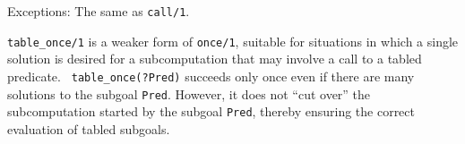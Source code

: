 \begin{description}
    Exceptions: The same as {\tt call/1}.

    {\tt table\_once/1} is a weaker form of {\tt once/1}, suitable for
    situations in which a single solution is desired for a
    subcomputation that may involve a call to a tabled predicate.  {\tt
    table\_once(?Pred)} succeeds only once even if there are many
    solutions to the subgoal {\tt Pred}.  However, it does not ``cut
    over'' the subcomputation started by the subgoal {\tt Pred},
    thereby ensuring the correct evaluation of tabled subgoals.

\end{description}


